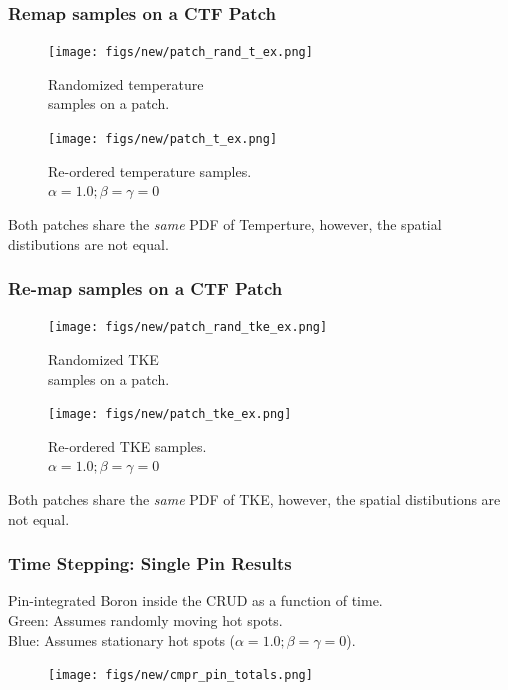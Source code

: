\documentclass[t, pdftex]{beamer}
\begin{document}
\begin{frame}
\frametitle{Remap samples on a CTF Patch}
    \begin{figure}
        \centering
        \begin{minipage}{.5\textwidth}
            \centering
            \texttt{[image: figs/new/patch\_rand\_t\_ex.png]}
            \caption{\centering Randomized temperature \\ samples on a patch.}
        \end{minipage}%
        \begin{minipage}{.5\textwidth}
            \centering
            \texttt{[image: figs/new/patch\_t\_ex.png]}
            \caption{\centering Re-ordered temperature samples. \\ $\alpha=1.0; \beta=\gamma=0$}
        \end{minipage}
    \end{figure}
Both patches share the \emph{same} PDF of Temperture, however, the spatial distibutions are not equal.
\end{frame}

\begin{frame}
\frametitle{Re-map samples on a CTF Patch}
    \begin{figure}
        \centering
        \begin{minipage}{.5\textwidth}
            \centering
            \texttt{[image: figs/new/patch\_rand\_tke\_ex.png]}
            \caption{\centering Randomized TKE \\  samples on a patch.}
        \end{minipage}%
        \begin{minipage}{.5\textwidth}
            \centering
            \texttt{[image: figs/new/patch\_tke\_ex.png]}
            \caption{\centering Re-ordered TKE samples. \\ $\alpha=1.0; \beta=\gamma=0$}
        \end{minipage}
    \end{figure}
Both patches share the \emph{same} PDF of TKE, however, the spatial distibutions are not equal.
\end{frame}

\begin{frame}
\frametitle{Time Stepping: Single Pin Results}
\tiny{
Pin-integrated Boron inside the CRUD as a function of time.  \\ 
{\color{green} Green: Assumes randomly moving hot spots.} \\
{\color{blue} Blue: Assumes stationary hot spots ($\alpha=1.0; \beta=\gamma=0$).}
}
\begin{figure}[!htbp]
\centering
\texttt{[image: figs/new/cmpr\_pin\_totals.png]}
\label{model_overview}
\end{figure}
\end{frame}
\end{document}
